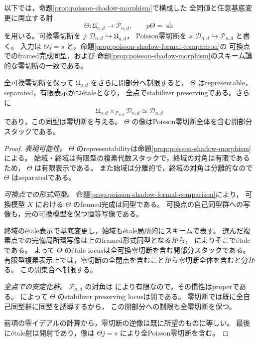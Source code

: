 以下では，命題\ref{prop:poisson-shadow-morphism}で構成した
全同値と任意基底変更に両立する射
\[
 \Theta:\mathfrak U_{n,d}\longrightarrow\mathcal P_{n,d},
 \qquad p\Theta=\operatorname{sh}
\]
を用いる。可換零切断を $j:\mathcal D_{n,d}\hookrightarrow\mathfrak U_{n,d}$，
Poisson零切断を $s:\mathcal D_{n,d}\hookrightarrow\mathcal P_{n,d}$ と書く。
入力は $\Theta j=s$ と，命題\ref{prop:poisson-shadow-formal-comparison}の
可換点でのframed完成同型，および
命題\ref{prop:poisson-shadow-morphism}のスキーム論的な零切断の一致である。

\begin{theorem}
\label{thm:poisson-shadow-etale}
全可換零切断を保って $\mathfrak U_{n,d}$ をさらに開部分へ制限すると，
$\Theta$ はrepresentable，separated，有限表示かつ\'{e}taleとなり，
全点でstabilizer preservingである。さらに
\[
 \mathfrak U_{n,d}\times_{\mathcal P_{n,d}}\mathcal D_{n,d}
 \simeq\mathcal D_{n,d}
\]
であり，この同型は零切断を与える。
$\Theta$ の像はPoisson零切断全体を含む開部分スタックである。
\end{theorem}
\begin{proof}
\emph{表現可能性。}
$\Theta$ のrepresentabilityは命題\ref{prop:poisson-shadow-morphism}による。
始域・終域は有限型の複素代数スタックで，終域の対角は有限であるため，
$\Theta$ は有限表示である。
また始域は分離的で，終域の対角は分離的なので $\Theta$ はseparatedである。

\emph{可換点での形式同型。}
命題\ref{prop:poisson-shadow-formal-comparison}により，
可換模型 $X$ における $\Theta$ のframed完成は同型である。
可換点の自己同型群への写像も，元の可換模型を保つ恒等写像である。

終域の\'{e}tale表示で基底変更し，始域も\'{e}tale局所的にスキームで表す。
選んだ複素点での完備局所環写像は上のframed形式同型となるから，
\cite[Lemma 41.11.3, Tag 039M]{StacksProject}によりそこで\'{e}taleである。
よって $\Theta$ の\'{e}tale locusは全可換零切断を含む開部分スタックである。
有限型複素表示上では，零切断の全閉点を含むことから零切断全体を含むと分かる。
この開集合へ制限する。

\emph{全点での安定化群。}
$\mathcal P_{n,d}$ の対角は
\cite[定理9.2]{PoissonDP}により有限なので，その慣性はproperである。
\cite[Lemma 101.45.4, Tag 0DUA]{StacksProject}によって
$\Theta$ のstabilizer preserving locusは開である。
零切断では既に全自己同型群に同型を誘導するから，
この開部分への制限も全零切断を保つ。

前項の零イデアルの計算から，零切断の逆像は既に所望のものに等しい。
最後に\'{e}tale射は開射であり，像は $\Theta j=s$ により全Poisson零切断を含む。
\end{proof}

